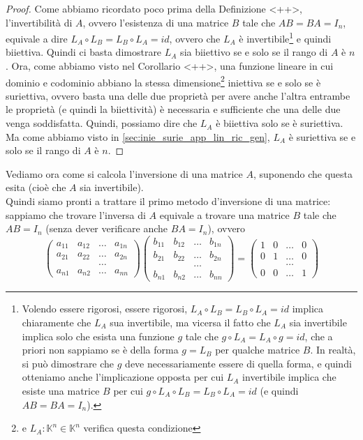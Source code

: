 \begin{proof}
  Come abbiamo ricordato poco prima della Definizione <++>, l'invertibilità di $A$, ovvero l'esistenza di una
  matrice $B$ tale che $AB=BA=I_n$, equivale a dire $L_A\circ L_B=L_B\circ L_A=id$, ovvero che $L_A$ è
  invertibile\footnote{Volendo essere rigorosi, essere rigorosi, $L_A\circ L_B=L_B\circ L_A=id$ implica
    chiaramente che $L_A$ sua invertibile, ma vicersa il fatto che $L_A$ sia invertibile implica solo che esista
    una funzione $g$ tale che $g\circ L_A=L_A\circ g =id$, che a priori non sappiamo se è della forma $g=L_B$ per
    qualche matrice $B$. In realtà, si può dimostrare che $g$ deve necessariamente essere di quella forma, e
    quindi otteniamo anche l'implicazione opposta per cui $L_A$ invertibile implica che esiste una matrice $B$
    per cui $g\circ L_A\circ L_B=L_B\circ L_A =id$ (e quindi $AB=BA=I_n$).} e quindi biiettiva. Quindi ci basta
  dimostrare $L_A$ sia biiettivo se e solo se il rango di $A$ è $n$. Ora, come abbiamo visto nel Corollario <++>,
  una funzione lineare in cui dominio e codominio abbiano la stessa dimensione\footnote{e $L_A: \mathbb{K}^n\in
    \mathbb{K}^n$ verifica questa condizione} iniettiva se e solo se è suriettiva, ovvero basta una delle due
  proprietà per avere anche l'altra entrambe le proprietà (e quindi la biiettività) è necessaria e sufficiente
  che una delle due venga soddisfatta. Quindi, possiamo dire che $L_A$ è biiettiva solo se è suriettiva.
  Ma come abbiamo visto in \ref{sec:inie_surie_app_lin_ric_gen}, $L_A$ è suriettiva se e solo se il rango
  di $A$ è $n$. 
\end{proof}
Vediamo ora come si calcola l'inversione di una matrice $A$, suponendo che questa esita (cioè che $A$ sia
invertibile).\\
Quindi siamo pronti a trattare il primo metodo d'inversione di una matrice: sappiamo che trovare l'inversa
di $A$ equivale a trovare una matrice $B$ tale che $AB=I_n$ (senza dever verificare anche $BA=I_n$), ovvero
\begin{equation*}
  \begin{pmatrix}
    a_{11} &a_{12} &\dots & a_{1n}\\
    a_{21} & a_{22} & \dots & a_{2n} \\
           && \dots\\
    a_{n1} & a_{n2} & \dots&a_{nn}
  \end{pmatrix}
  \begin{pmatrix}
    b_{11} &b_{12} &\dots & b_{1n}\\
    b_{21} & b_{22} & \dots & b_{2n} \\
           && \dots\\
    b_{n1} & b_{n2} & \dots&b_{nn}
  \end{pmatrix}=
  \begin{pmatrix}
    1 &0 &\dots&0\\
    0 & 1 &\dots & 0\\
      &&\dots\\
    0 & 0&\dots & 1
  \end{pmatrix}
\end{equation*}

